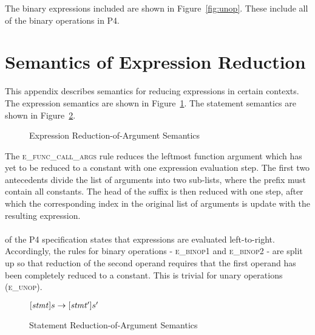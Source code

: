 \documentclass[UTF8]{article}
\begin{document}
The binary expressions included are shown in Figure~\ref{fig:unop}. These include all of the binary operations in P4.

\section{Semantics of Expression Reduction}
\label{app:exp}
This appendix describes semantics for reducing expressions in certain contexts. The expression semantics are shown in Figure~\ref{fig:semexp2}. The statement semantics are shown in Figure~\ref{fig:semstmt2}.

\begin{figure}[ht!]
\caption{Expression Reduction-of-Argument Semantics}
\label{fig:semexp2}
\end{figure}

The \textsc{e\_func\_call\_args} rule reduces the leftmost function argument which has yet to be reduced to a constant with one expression evaluation step. The first two antecedents divide the list of arguments into two sub-lists, where the prefix must contain all constants. The head of the suffix is then reduced with one step, after which the corresponding index in the original list of arguments is update with the resulting expression.
\\~\\
 of the P4 specification states that expressions are evaluated left-to-right. Accordingly, the rules for binary operations - \textsc{e\_binop1} and \textsc{e\_binop2} - are split up so that reduction of the second operand requires that the first operand has been completely reduced to a constant. This is trivial for unary operations (\textsc{e\_unop}).

\begin{figure}[ht!]
\begin{ottdefnblock}{$[  \mathit{stmt}  ]  s  \rightarrow  [  \mathit{stmt'}  ]  s'$}{}
\ottusedrule{\ottdrulestmtXXretXXe{}}
\ottusedrule{\ottdrulestmtXXassXXe{}}
\ottusedrule{\ottdrulestmtXXcondXXe{}}
\ottusedrule{\ottdrulestmtXXverifyXXeOne{}}
\ottusedrule{\ottdrulestmtXXverifyXXeTwo{}}
\end{ottdefnblock}
\caption{Statement Reduction-of-Argument Semantics}
\label{fig:semstmt2}
\end{figure}

\printbibliography
\end{document}
